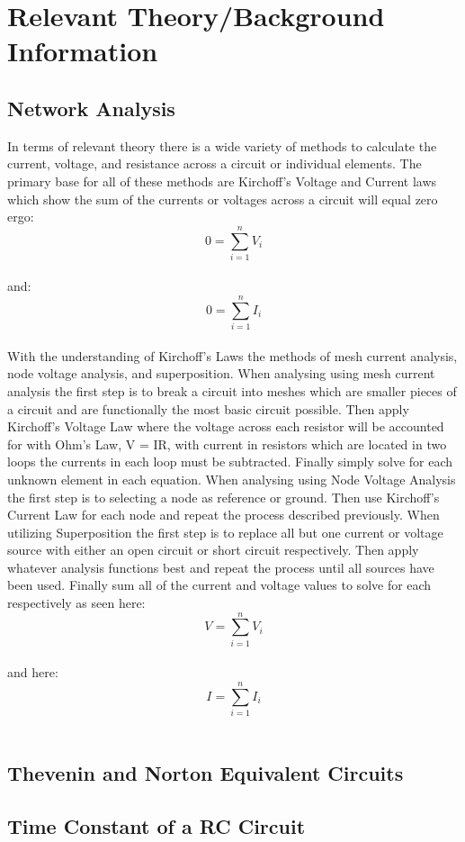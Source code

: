 \documentclass[a4paper]{article}
\begin{document}
\section{Relevant Theory/Background Information}

\subsection{Network Analysis}
In terms of relevant theory there is a wide variety of methods to calculate the current, voltage, and resistance across a circuit or individual elements. The primary base for all of these methods are Kirchoff's Voltage and Current
laws which show the sum of the currents or voltages across a circuit will equal zero ergo: \\
\[0 = \sum_{i=1}^{n} V_{i}\]\\
and: \\
\[0 = \sum_{i=1}^{n} I_{i}\]\\
With the understanding of Kirchoff's Laws the methods of mesh current analysis, node voltage analysis, and superposition. 
When analysing using mesh current analysis the first step is to break a circuit into meshes which are smaller pieces of a circuit and are functionally the most basic circuit possible.
Then apply Kirchoff's Voltage Law where the voltage across each resistor will be accounted for with Ohm's Law, V = IR, with current in resistors which are located in two loops the currents in each loop must be subtracted. Finally simply solve for each unknown element in each equation.
When analysing using Node Voltage Analysis the first step is to selecting a node as reference or ground. Then use Kirchoff's Current Law for each node and repeat the process described previously.
When utilizing Superposition the first step is to replace all but one current or voltage source with either an open circuit or short circuit respectively. Then apply whatever analysis functions best and repeat the process until all sources have been used. Finally sum all of the current and voltage values to solve for each respectively as seen here:
\[V = \sum_{i=1}^{n} V_{i}\]\\
and here: \\
\[I = \sum_{i=1}^{n} I_{i}\]\\  
\subsection{Thevenin and Norton Equivalent Circuits}
\lipsum[1]

\subsection{Time Constant of a RC Circuit}
\lipsum[1]
\end{document}
